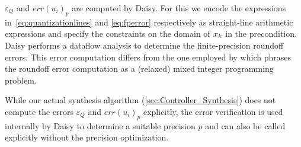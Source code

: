 $\varepsilon_Q$ and $err(u_{i})_{p}$ are computed by Daisy. For this we encode
the expressions in~\autoref{eq:quantizationlines} and \autoref{eq:fperror}
respectively as straight-line arithmetic expressions and specify the constraints
on the domain of $x_{k}$ in the precondition.
Daisy performs a dataflow analysis to determine the finite-precision roundoff
errors. This error computation differs from the one employed by
\citet{imperialrmpc} which phrases the roundoff error computation as a (relaxed)
mixed integer programming problem.

While our actual synthesis algorithm (\autoref{sec:Controller_Synthesis}) does
not compute the errors $\varepsilon_Q$ and $err(u_{i})_{p}$ explicitly, the
error verification is used internally by Daisy to determine a suitable precision
$p$ and can also be called explicitly without the precision optimization.



